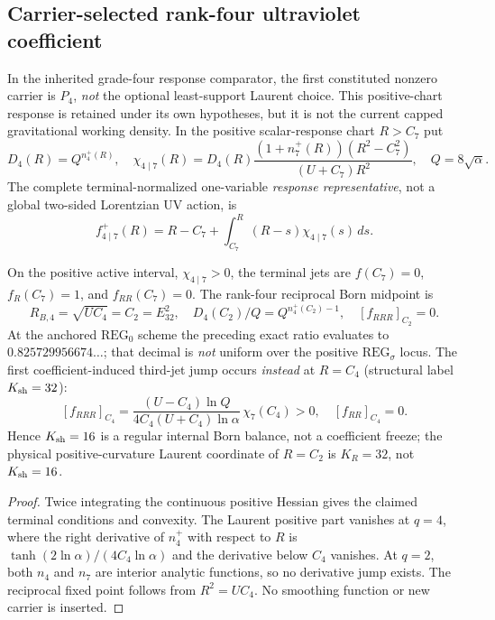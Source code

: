 \documentclass[12pt,a4paper]{article}
\begin{document}
\subsection{Carrier-selected rank-four ultraviolet coefficient}
\label{p3e:subsec:v2219-carrier4-current}
In the inherited grade-four response comparator, the first constituted
nonzero carrier is $P_4$, \emph{not} the optional least-support Laurent
choice. This positive-chart response is retained under its own hypotheses,
but it is not the current capped gravitational working density. In the
positive scalar-response chart $R>C_7$ put
\begin{equation}\label{p3e:eq:v2219-carrier-four-response}
\boxed{D_4(R)=Q^{n_4^+(R)},\quad
\chi_{4\mid7}(R)=D_4(R)
\frac{(1+n_7^+(R))(R^2-C_7^2)}{(U+C_7)R^2},\quad Q=8\sqrt\alpha.}
\end{equation}
The complete terminal-normalized one-variable \emph{response representative},
not a global two-sided Lorentzian UV action, is
\begin{equation}\label{p3e:eq:v2219-carrier-four-legendre}
\boxed{f_{4\mid7}^{+}(R)=R-C_7+
\int_{C_7}^{R}(R-s)\chi_{4\mid7}(s)\,ds.}
\end{equation}
\begin{theorem}
\label{p3e:thm:v2219-carrier-four-jets}
On the positive active interval, $\chi_{4\mid7}>0$, the terminal jets
are $f(C_7)=0$, $f_R(C_7)=1$, and $f_{RR}(C_7)=0$.
The rank-four reciprocal Born midpoint is
\[
 \boxed{R_{B,4}=\sqrt{UC_4}=C_2=E_{32}^2,\quad
 D_4(C_2)/Q=Q^{n_4^+(C_2)-1},\quad
 [f_{RRR}]_{C_2}=0.}
\]
At the anchored $\mathrm{REG}_0$ scheme the preceding exact ratio
evaluates to $0.825729956674\ldots$; that decimal is \emph{not}
uniform over the positive $\mathrm{REG}_\sigma$ locus.
The first coefficient-induced third-jet jump occurs \emph{instead} at
$R=C_4$ (structural label $K_{\rm sh}=32$):
\begin{equation}\label{p3e:eq:v2219-c4-third-jet}
\boxed{[f_{RRR}]_{C_4}=
\frac{(U-C_4)\ln Q}{4C_4(U+C_4)\ln\alpha}\,\chi_7(C_4)>0,\quad
 [f_{RR}]_{C_4}=0.}
\end{equation}
Hence $K_{\rm sh}=16$ is a regular internal Born balance, not a coefficient
freeze; the physical positive-curvature Laurent coordinate of $R=C_2$ is
$K_R=32$, not $K_{\rm sh}=16$.
\end{theorem}
\begin{proof}
Twice integrating the continuous positive Hessian gives the claimed
terminal conditions and convexity.  The Laurent positive part vanishes
at $q=4$, where the right derivative of $n_4^+$ with respect to $R$ is
$\tanh(2\ln\alpha)/(4C_4\ln\alpha)$ and the derivative below $C_4$
vanishes.  At $q=2$, both $n_4$ and $n_7$ are interior analytic functions,
so no derivative jump exists.  The reciprocal fixed point follows from
$R^2=UC_4$.  No smoothing function or new carrier is inserted.
\end{proof}
\end{document}
